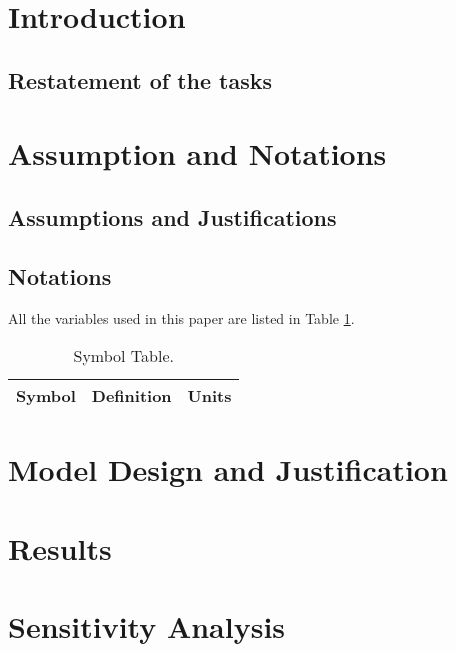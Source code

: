 \documentclass[a4paper]{article}
\begin{document}
%	
	\newpage
	\tableofcontents
	\newpage
\section{Introduction}
	\subsection{Restatement of the tasks}
\section{Assumption and Notations}
	\subsection{Assumptions and Justifications}


	\subsection{Notations}
    All the variables used in this paper are listed in Table \ref{t1}.

    \begin{table}[H]
    \centering
    \begin{tabular}{lll}
    \toprule
		Symbol & Definition & Units \\
		\midrule
    \bottomrule
    \end{tabular}
    \caption{Symbol Table.}
    \label{t1}
    \end{table}

\section{Model Design and Justification}
\section{Results}
\section{Sensitivity Analysis}
	
\end{document}
